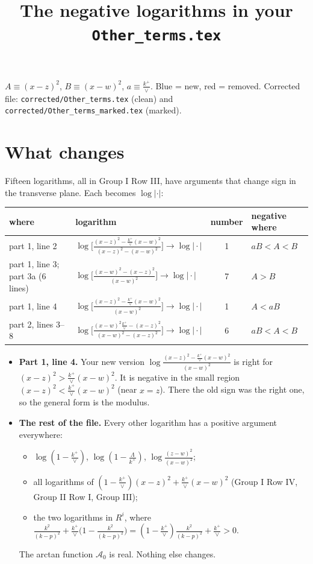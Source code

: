 \documentclass[10pt]{article}
\title{The negative logarithms in your \texttt{Other\_terms.tex}}
\date{}
\newcommand{\new}[1]{{\color{blue}#1}}
\newcommand{\old}[1]{{\color{red}#1}}
\begin{document}
\maketitle
\noindent $A\equiv(x-z)^2$, $B\equiv(x-w)^2$, $a\equiv\frac{k^+}{\vee}$. \new{Blue} = new, \old{red} = removed. Corrected file: \texttt{corrected/Other\_terms.tex} (clean) and \texttt{corrected/Other\_terms\_marked.tex} (marked).

\section{What changes}
Fifteen logarithms, all in Group I Row III, have arguments that change sign in the transverse plane. Each becomes $\log|\cdot|$:
\begin{center}\small
\begin{tabular}{@{}llcl@{}}\toprule
where & logarithm & number & negative where\\\midrule
part 1, line 2 & $\log\Big[\frac{(x-z)^2-\frac{k^+}{\vee}(x-w)^2}{(x-z)^2-(x-w)^2}\Big]\to\log\Big|\cdot\Big|$ & 1 & $aB<A<B$\\[4pt]
part 1, line 3; part 3a (6 lines) & $\log\Big[\frac{(x-w)^2-(x-z)^2}{(x-w)^2}\Big]\to\log\Big|\cdot\Big|$ & 7 & $A>B$\\[4pt]
part 1, line 4 & $\log\Big[\frac{(x-z)^2-\frac{k^+}{\vee}(x-w)^2}{(x-w)^2}\Big]\to\log\Big|\cdot\Big|$ & 1 & $A<aB$\\[4pt]
part 2, lines 3--8 & $\log\Big[\frac{(x-w)^2\frac{k^+}{\vee}-(x-z)^2}{(x-w)^2-(x-z)^2}\Big]\to\log\Big|\cdot\Big|$ & 6 & $aB<A<B$\\\bottomrule
\end{tabular}
\end{center}
\begin{itemize}
\item \textbf{Part 1, line 4.} Your new version $\log\frac{(x-z)^2-\frac{k^+}{\vee}(x-w)^2}{(x-w)^2}$ is right for $(x-z)^2>\frac{k^+}{\vee}(x-w)^2$. It is negative in the small region $(x-z)^2<\frac{k^+}{\vee}(x-w)^2$ (near $x=z$). There the old sign was the right one, so the general form is the modulus.
\item \textbf{The rest of the file.} Every other logarithm has a positive argument everywhere:
\begin{itemize}
\item $\log(1-\frac{k^+}{\vee})$, $\log(1-\frac{\Lambda}{k^+})$, $\log\frac{(z-w)^2}{(x-w)^2}$;
\item all logarithms of $(1-\frac{k^+}{\vee})(x-z)^2+\frac{k^+}{\vee}(x-w)^2$ (Group I Row IV, Group II Row I, Group III);
\item the two logarithms in $R^i$, where $\frac{k^2}{(k-p)^2}+\frac{k^+}{\vee}\big(1-\frac{k^2}{(k-p)^2}\big)=(1-\frac{k^+}{\vee})\frac{k^2}{(k-p)^2}+\frac{k^+}{\vee}>0$.
\end{itemize}
The arctan function $\mathcal A_0$ is real. Nothing else changes.
\end{itemize}
\end{document}
